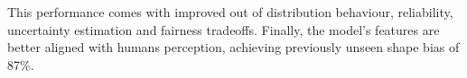 This performance comes with improved out of distribution behaviour, reliability, uncertainty estimation and fairness tradeoffs.
Finally, the model's features are better aligned with humans perception, achieving previously unseen shape bias of 87\%.


%




